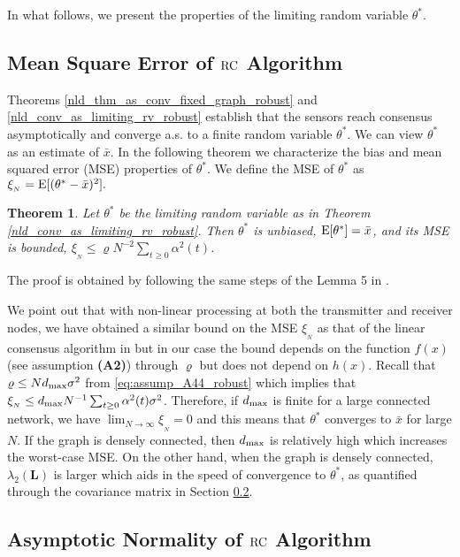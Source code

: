 \documentclass[onecolumn, draft, 12pt]{IEEEtran}
\newcommand{\vrho}{\ensuremath{\varrho}}
\newcommand{\E}{{\rm E}}
\newcommand{\mse}{\xi_{_{N}}}
\newcommand{\rnld}{\rm RC}
\newcommand{\La}{\mathbf{L}}
\newcommand{\xbar}{\bar{x}}
\newcommand{\cval}{\ensuremath{\theta^{*}}}
\newtheorem{thm}{Theorem}
\begin{document}
In what follows, we present the properties of the limiting random variable $\cval$.

\subsection{Mean Square Error of $\rnld$ Algorithm}\label{subsec:mse_nld_robust}
Theorems \ref{nld_thm_as_conv_fixed_graph_robust} and \ref{nld_conv_as_limiting_rv_robust} establish that the sensors reach consensus asymptotically and converge a.s. to a finite random variable  $\cval$. We can view $\cval$ as an estimate of  $\xbar$. In the following theorem we characterize the bias and mean squared error (MSE) properties of $\cval$.  We define the MSE of $\cval$ as $\mse = \E [(\cval - \xbar)^2].$

\begin{thm} \label{nld_limiting_rv_mse_robust}
Let $\cval$ be the limiting random variable as in Theorem  \ref{nld_conv_as_limiting_rv_robust}. Then $\cval$ is unbiased, $\E [\cval] =\xbar$, and its MSE is bounded, $\mse \leq  \vrho N^{-2} \displaystyle\sum_{t \geq 0} \alpha^2(t)$.
\end{thm}
The proof is obtained by following the same steps of the Lemma 5 in \cite{KarMoura2009}. 

We point out that with non-linear processing at both the transmitter and receiver nodes, we have obtained a similar bound on the MSE $\mse$ as that of the linear consensus algorithm in \cite{KarMoura2009} but in our case the bound depends on the function $f(x)$ (see assumption \textbf{(A2)}) through $\vrho$ but does not depend on $h(x)$. Recall that $\vrho \leq N d_{\rm max} \sigma^2$ from \eqref{eq:assump_A44_robust} which implies that $\mse \leq  d_{\rm max} N^{-1} \sum_{t \geq 0} \alpha^2(t) \sigma^2$. Therefore, if $d_{\rm max}$ is finite for a large connected network, we have $\lim_{N \rightarrow \infty} \mse =0$ and this means that $\cval$ converges to $\xbar$ for large $N$. If the graph is densely connected, then $d_{\rm max}$ is relatively high which increases the worst-case MSE. On the other hand, when the graph is densely connected, $\lambda_2 (\La)$ is larger which aids in the speed of convergence to $\cval$, as quantified through the covariance matrix in Section \ref{subsec:asym_norm_nld_robust}. 

\subsection{Asymptotic Normality of $\rnld$ Algorithm}\label{subsec:asym_norm_nld_robust} 
\end{document}

